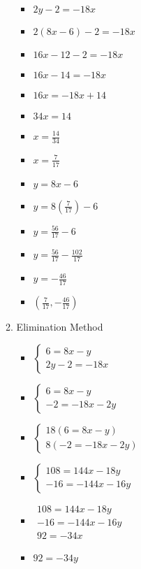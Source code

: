 \documentclass{article}
\begin{document}
\begin{enumerate}
\begin{enumerate}
\begin{itemize}
    \item $2y-2=-18x$
    \item $2(8x-6)-2=-18x$
    \item $16x-12-2=-18x$
    \item $16x-14=-18x$
    \item $16x=-18x+14$
    \item $34x=14$
    \item {\Large $x=\frac{14}{34}$}
    \item {\Large $x=\frac{7}{17}$}
    \item $y=8x-6$
    \item {\Large $y=8\left(\frac{7}{17}\right)-6$}
    \item {\Large $y=\frac{56}{17}-6$}
    \item {\Large $y=\frac{56}{17}-\frac{102}{17}$}
    \item {\Large $y=-\frac{46}{17}$}
    \item {\Large $\left(\frac{7}{17},-\frac{46}{17}\right)$}
    \end{itemize}
  \item Elimination Method
    \begin{itemize}
    \item $\left\{ \begin{array}{l}
          6=8x-y \\
          2y-2=-18x \end{array} \right.$
    \item $\left\{ \begin{array}{l}
          6=8x-y \\
          -2=-18x-2y \end{array} \right.$
    \item $\left\{ \begin{array}{l}
          18(6=8x-y) \\
          8(-2=-18x-2y) \end{array} \right.$
    \item $\left\{ \begin{array}{l}
          108=144x-18y \\
          -16=-144x-16y \end{array} \right.$
    \item $\begin{array}{l}
          108=144x-18y \\
          -16=-144x-16y \\ \hline
          92=-34x\end{array}$
    \item $92=-34y$

\end{itemize}
\end{enumerate}
\end{enumerate}
\end{document}
